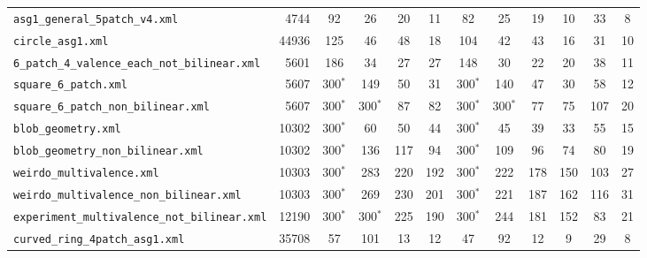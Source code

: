 \documentclass[10pt,a4paper]{article}
\begin{document}
{\begin{longtable}{@{}lrcccccccccc@{}}
\texttt{asg1\_general\_5patch\_v4.xml} & 4744 & 92 & 26 & 20 & 11 & 82 & 25 & 19 & 10 & 33 & 8 \\
\texttt{circle\_asg1.xml} & 44936 & 125 & 46 & 48 & 18 & 104 & 42 & 43 & 16 & 31 & 10 \\
\texttt{6\_patch\_4\_valence\_each\_not\_bilinear.xml} & 5601 & 186 & 34 & 27 & 27 & 148 & 30 & 22 & 20 & 38 & 11 \\
\texttt{square\_6\_patch.xml} & 5607 & 300$^*$ & 149 & 50 & 31 & 300$^*$ & 140 & 47 & 30 & 58 & 12 \\
\texttt{square\_6\_patch\_non\_bilinear.xml} & 5607 & 300$^*$ & 300$^*$ & 87 & 82 & 300$^*$ & 300$^*$ & 77 & 75 & 107 & 20 \\
\texttt{blob\_geometry.xml} & 10302 & 300$^*$ & 60 & 50 & 44 & 300$^*$ & 45 & 39 & 33 & 55 & 15 \\
\texttt{blob\_geometry\_non\_bilinear.xml} & 10302 & 300$^*$ & 136 & 117 & 94 & 300$^*$ & 109 & 96 & 74 & 80 & 19 \\
\texttt{weirdo\_multivalence.xml} & 10303 & 300$^*$ & 283 & 220 & 192 & 300$^*$ & 222 & 178 & 150 & 103 & 27 \\
\texttt{weirdo\_multivalence\_non\_bilinear.xml} & 10303 & 300$^*$ & 269 & 230 & 201 & 300$^*$ & 221 & 187 & 162 & 116 & 31 \\
\texttt{experiment\_multivalence\_not\_bilinear.xml} & 12190 & 300$^*$ & 300$^*$ & 225 & 190 & 300$^*$ & 244 & 181 & 152 & 83 & 21 \\
\texttt{curved\_ring\_4patch\_asg1.xml} & 35708 & 57 & 101 & 13 & 12 & 47 & 92 & 12 & 9 & 29 & 8 \\
\bottomrule
\end{longtable}
}
\end{document}
